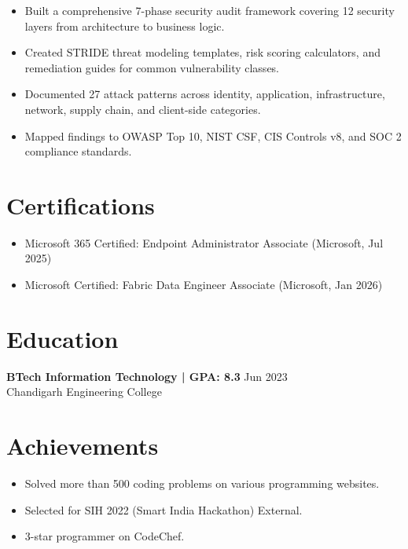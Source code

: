 \documentclass[11pt,a4paper]{article}
\begin{document}
\begin{itemize}
  \item Built a comprehensive 7-phase security audit framework covering 12 security layers from architecture to business logic.
  \item Created STRIDE threat modeling templates, risk scoring calculators, and remediation guides for common vulnerability classes.
  \item Documented 27 attack patterns across identity, application, infrastructure, network, supply chain, and client-side categories.
  \item Mapped findings to OWASP Top 10, NIST CSF, CIS Controls v8, and SOC 2 compliance standards.
\end{itemize}
\vspace{2pt}

\section{Certifications}
\begin{itemize}
  \item Microsoft 365 Certified: Endpoint Administrator Associate (Microsoft, Jul 2025)
  \item Microsoft Certified: Fabric Data Engineer Associate (Microsoft, Jan 2026)
\end{itemize}

\section{Education}
\textbf{BTech Information Technology | GPA: 8.3} \hfill Jun 2023
\\ Chandigarh Engineering College
\vspace{2pt}

\section{Achievements}
\begin{itemize}
  \item Solved more than 500 coding problems on various programming websites.
  \item Selected for SIH 2022 (Smart India Hackathon) External.
  \item 3-star programmer on CodeChef.
\end{itemize}
\end{document}
